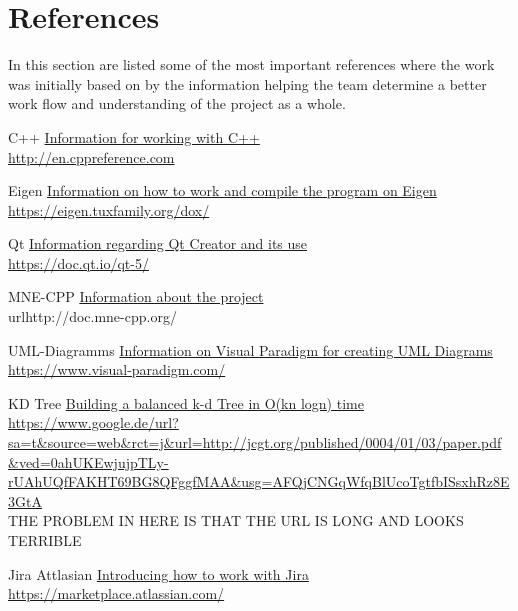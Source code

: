 \section{References}

In this section are listed some of the most important references where the work was initially based on by the information helping the team determine a better work flow and understanding of the project as a whole. 

\begin{aims}
	\item [C++] 
	\href{http://en.cppreference.com}{Information for working with C++}\\
		\url{http://en.cppreference.com}
	\item [Eigen] 
	\href{https://eigen.tuxfamily.org/dox/}{Information on how to work and compile the program on Eigen}
\\		\url{https://eigen.tuxfamily.org/dox/}
	\item [Qt] 
	\href{https://doc.qt.io/qt-5/}{Information regarding Qt Creator and its use}\\
		\url{https://doc.qt.io/qt-5/}
	\item [MNE-CPP]
	\href{http://doc.mne-cpp.org/}{Information about the project}\\
		url{http://doc.mne-cpp.org/}
	\item [UML-Diagramms]
	\href{https://www.visual-paradigm.com/}{Information on Visual Paradigm for creating UML Diagrams}\\
		\url{https://www.visual-paradigm.com/}
	\item[KD Tree]
	\href{https://www.google.de/url?sa=t&source=web&rct=j&url=http://jcgt.org/published/0004/01/03/paper.pdf&ved=0ahUKEwjujpTLy-rUAhUQfFAKHT69BG8QFggfMAA&usg=AFQjCNGqWfqBlUcoTgtfbISsxhRz8E3GtA}{Building a balanced k-d Tree in O(kn logn) time}\\
	\url{https://www.google.de/url?sa=t&source=web&rct=j&url=http://jcgt.org/published/0004/01/03/paper.pdf&ved=0ahUKEwjujpTLy-rUAhUQfFAKHT69BG8QFggfMAA&usg=AFQjCNGqWfqBlUcoTgtfbISsxhRz8E3GtA}\\
	THE PROBLEM IN HERE IS THAT THE URL IS LONG AND LOOKS TERRIBLE\\
	\item [Jira Attlasian]
	\href{https://marketplace.atlassian.com/}{Introducing how to work with Jira}\\
	\url{https://marketplace.atlassian.com/}
	

	
\end{aims}